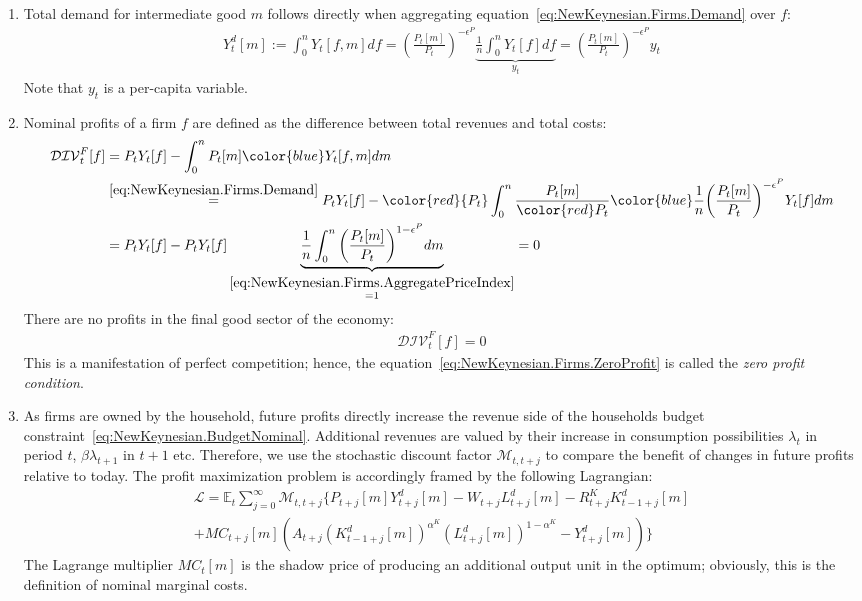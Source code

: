\begin{enumerate}
\item
Total demand for intermediate good \(m\) follows directly when aggregating equation~\eqref{eq:NewKeynesian.Firms.Demand} over \(f\):
\begin{align*}
Y^{d}_{t}[m] := \int_{0}^{n} Y_{t}[f,m] df
= {\left(\frac{P_{t}[m]}{P_{t}}\right)}^{-\epsilon^{P}} \underbrace{\frac{1}{n} \int_{0}^{n} Y_{t}[f] df}_{y_{t}}
= {\left(\frac{P_{t}[m]}{P_{t}}\right)}^{-\epsilon^{P}} y_{t}
\end{align*}
Note that \(y_{t}\) is a per-capita variable.

\item
Nominal profits of a firm \(f\) are defined as the difference between total revenues and total costs:
\begin{align*}
\mathcal{DIV}^{F}_{t}[f]
&= P_{t} Y_{t}[f] - \int_{0}^{n} P_{t}[m] {\color{blue}Y_{t}[f,m]} dm
\\
&\overset{\eqref{eq:NewKeynesian.Firms.Demand}}{=}
P_{t} Y_{t}[f] - {\color{red}{P_{t}}}\int_{0}^{n} \frac{P_{t}[m]}{{\color{red}P_{t}}}
{\color{blue} \frac{1}{n} {\left(\frac{P_{t}[m]}{P_{t}}\right)}^{-\epsilon^{P}} Y_{t}[f]}
dm
\\
&=
P_{t} Y_{t}[f] - P_{t} Y_{t}[f]
\underbrace{%
  \frac{1}{n} \int_{0}^{n}  {\left(\frac{P_{t}[m]}{P_{t}}\right)}^{1-\epsilon^{P}} dm
}_{\overset{\eqref{eq:NewKeynesian.Firms.AggregatePriceIndex}}{=1}}
= 0
\end{align*}
There are no profits in the final good sector of the economy:
\begin{align}
\mathcal{DIV}^{F}_{t}[f] = 0 \label{eq:NewKeynesian.Firms.Final.ZeroProfit}
\end{align}
This is a manifestation of perfect competition;
  hence, the equation~\eqref{eq:NewKeynesian.Firms.ZeroProfit} is called the \emph{zero profit condition}.

\item
As firms are owned by the household, future profits directly increase the revenue side of the households budget constraint~\eqref{eq:NewKeynesian.BudgetNominal}.
Additional revenues are valued by their increase in consumption possibilities \(\lambda_{t}\) in period \(t\), \(\beta \lambda_{t+1}\) in \(t+1\) etc.
Therefore, we use the stochastic discount factor \(\mathcal{M}_{t,t+j}\) to compare the benefit of changes in future profits relative to today.
The profit maximization problem is accordingly framed by the following Lagrangian:
\begin{multline}
\mathcal{L} = \mathbb{E}_{t} \sum_{j=0}^{\infty} \mathcal{M}_{t,t+j} \Bigg \{
P_{t+j}[m] Y^{d}_{t+j}[m] - W_{t+j} L^{d}_{t+j}[m] - R^{K}_{t+j} K^{d}_{t-1+j}[m]
\\
+ {MC}_{t+j}[m] \left(
  A_{t+j} {(K^{d}_{t-1+j}[m])}^{\alpha^{K}} {(L^{d}_{t+j}[m])}^{1-\alpha^{K}} - Y^{d}_{t+j}[m]\right)
\Bigg \}
\label{eq:IntermediateFirms.Lagrangian}
\end{multline}
The Lagrange multiplier \({MC}_{t}[m]\) is the shadow price of producing an additional output unit in the optimum;
  obviously, this is the definition of nominal marginal costs.


\end{enumerate}
